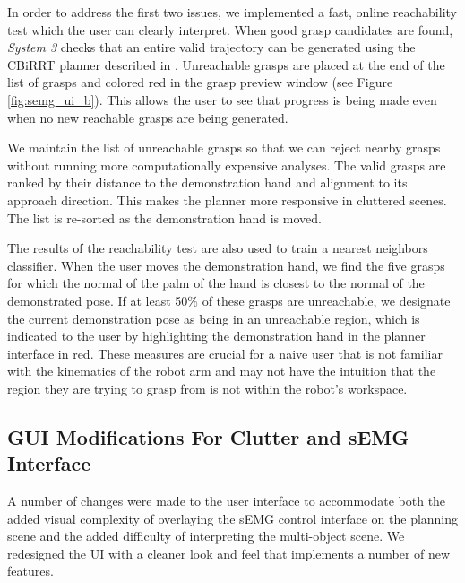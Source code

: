In order to address the first two issues, we implemented a fast, online reachability test which the user can clearly interpret. When good grasp candidates are found, \emph{System 3} checks that an entire valid trajectory can be generated using the CBiRRT planner described in \cite{berenson-09}. Unreachable grasps are placed at the end of the list of grasps and colored red in the grasp preview window (see Figure \ref{fig:semg_ui_b}). This allows the user to see that progress is being made even when no new reachable grasps are being generated.

We maintain the list of unreachable grasps so that we can reject nearby grasps without running more computationally expensive analyses. The valid grasps are ranked by their distance to the demonstration hand and alignment to its approach direction. This makes the planner more responsive in cluttered scenes. The list is re-sorted as the demonstration hand is moved.

The results of the reachability test are also used to train a nearest neighbors classifier. When the user moves the demonstration hand, we find the five grasps for which the normal of the palm of the hand is closest to the normal of the demonstrated pose. If at least 50\% of these grasps are unreachable, we designate the current demonstration pose as being in an unreachable region, which is indicated to the user by highlighting the demonstration hand in the planner interface in red. These measures are crucial for a naive user that is not familiar with the kinematics of the robot arm and may not have the intuition that the region they are trying to grasp from is not within the robot's workspace.

\subsection{GUI Modifications For Clutter and sEMG Interface}
 A number of changes were made to the user interface to accommodate both the added visual complexity of overlaying the sEMG control interface on the planning scene and the added difficulty of interpreting the multi-object scene. We redesigned the UI with a cleaner look and feel that implements a number of new features. 

